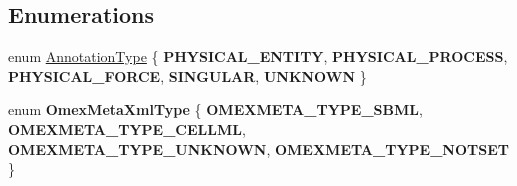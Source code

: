 \subsection*{Enumerations}
\begin{DoxyCompactItemize}
\item 
enum \hyperlink{namespaceomexmeta_a1129ebb8a92218ebb27b9c76ac8462f7}{Annotation\+Type} \{ \newline
{\bfseries P\+H\+Y\+S\+I\+C\+A\+L\+\_\+\+E\+N\+T\+I\+TY}, 
{\bfseries P\+H\+Y\+S\+I\+C\+A\+L\+\_\+\+P\+R\+O\+C\+E\+SS}, 
{\bfseries P\+H\+Y\+S\+I\+C\+A\+L\+\_\+\+F\+O\+R\+CE}, 
{\bfseries S\+I\+N\+G\+U\+L\+AR}, 
\newline
{\bfseries U\+N\+K\+N\+O\+WN}
 \}
\item 
\mbox{\label{namespaceomexmeta_a6d848ffddcd75e64efafb46013b0e6fb}} 
enum {\bfseries Omex\+Meta\+Xml\+Type} \{ {\bfseries O\+M\+E\+X\+M\+E\+T\+A\+\_\+\+T\+Y\+P\+E\+\_\+\+S\+B\+ML}, 
{\bfseries O\+M\+E\+X\+M\+E\+T\+A\+\_\+\+T\+Y\+P\+E\+\_\+\+C\+E\+L\+L\+ML}, 
{\bfseries O\+M\+E\+X\+M\+E\+T\+A\+\_\+\+T\+Y\+P\+E\+\_\+\+U\+N\+K\+N\+O\+WN}, 
{\bfseries O\+M\+E\+X\+M\+E\+T\+A\+\_\+\+T\+Y\+P\+E\+\_\+\+N\+O\+T\+S\+ET}
 \}
\end{DoxyCompactItemize}

